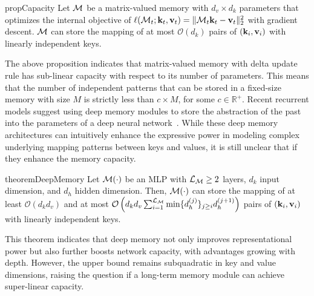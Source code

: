 \begin{restatable}{prop}{Capacity}\label{prop:linear-capacity}
 Let $\mathcal{M}$ be a matrix-valued memory with $d_v \times d_k$ parameters that optimizes the internal objective of $\ell(\mathcal{M}_t; \mathbf{k}_t, \mathbf{v}_t) = \|\mathcal{M}_t \mathbf{k}_t - \mathbf{v}_t \|^2_2$ with gradient descent. $\mathcal{M}$ can store the mapping of at most $\mathcal{O}\left( d_k \right)$ pairs of $(\mathbf{k}_i, \mathbf{v}_i)$ with linearly independent keys. 
\end{restatable} 
The above proposition indicates that matrix-valued memory with delta update rule has sub-linear capacity with respect to its number of parameters. This means that the number of independent patterns that can be stored in a fixed-size memory with size $M$ is strictly less than $c \times M$, for some $c \in \mathbb{R}^{+}$. Recent recurrent models suggest using deep memory modules to store the abstraction of the past into the parameters of a deep neural network~\citep{irie2021going, sun2024learning, behrouz2024titans, behrouz2025Miras}. While these deep memory architectures can intuitively enhance the expressive power in modeling complex underlying mapping patterns between keys and values, it is still unclear that if they enhance the memory capacity.  

\begin{restatable}{theorem}{DeepMemory}\label{thm:deep-memory}
 Let $\mathcal{M}(\cdot)$ be an MLP with $\mathcal{L}_{\mathcal{M}} \geq 2$ layers, $d_k$  input dimension, and $d_h$  hidden dimension. Then, $\mathcal{M}(\cdot)$ can store the mapping of at least $\mathcal{O}\left( d_k d_v \right)$ and at most $\mathcal{O}\left( d_k d_v \sum_{i = 1}^{\mathcal{L}_{\mathcal{M}}} \min \{d_h^{(j)}\}_{j \geq i} d_h^{(j+1)} \right)$ pairs of $(\mathbf{k}_i, \mathbf{v}_i)$ with linearly independent keys.  
\end{restatable}


This theorem indicates that deep memory not only improves representational power but also further boosts network capacity, with advantages growing with depth. However, the upper bound remains subquadratic in key and value dimensions, raising the question if a long-term memory module can achieve super-linear capacity.

